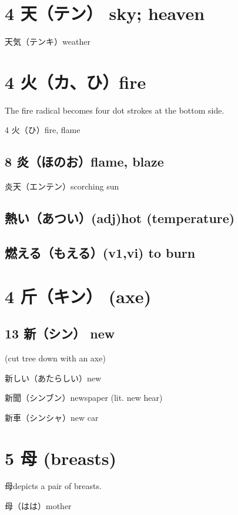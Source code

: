 \section{4 天（テン） sky; heaven}

天気（テンキ）weather

\section{4 火（カ、ひ）fire}

The fire radical becomes four dot strokes at the bottom side.

4 火（ひ）fire, flame

\subsection{8 炎（ほのお）flame, blaze}

炎天（エンテン）scorching sun

\subsection{熱い（あつい）(adj)hot (temperature)}

\subsection{燃える（もえる）(v1,vi) to burn}

\section{4 斤（キン） (axe)}

\subsection{13 新（シン） new}

(cut tree down with an axe)

新しい（あたらしい）new

新聞（シンブン）newspaper (lit. new hear)

新車（シンシャ）new car

\section{5 母 (breasts)}

母depicts a pair of breasts.

母（はは）mother

